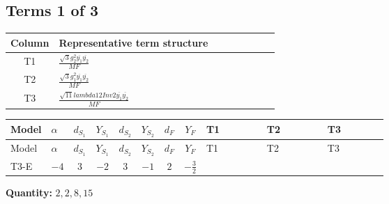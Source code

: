 \documentclass[8pt]{article}
\begin{document}
\begin{landscape}
\subsection*{Terms 1 of 3}
\begin{center}
\begin{tabular}{@{}c >{\raggedright\arraybackslash}p{0.82\linewidth}@{}}
\toprule
Column & Representative term structure \\
\midrule
T1 & \(\displaystyle \frac{\sqrt{3} g_{2}^{2} \overline{y_{1}} \overline{y_{2}}}{MF}\) \\
\midrule
T2 & \(\displaystyle \frac{\sqrt{3} g_{1}^{2} \overline{y_{1}} \overline{y_{2}}}{MF}\) \\
\midrule
T3 & \(\displaystyle \frac{\sqrt{11} lambda12Inv2 \overline{y_{1}} \overline{y_{2}}}{MF}\) \\
\midrule
\bottomrule
\end{tabular}
\end{center}
\smallskip
\tiny
\begin{longtable}{@{}llcccccc >{\raggedright\arraybackslash}p{0.21\linewidth} >{\raggedright\arraybackslash}p{0.21\linewidth} >{\raggedright\arraybackslash}p{0.21\linewidth}@{}}
\toprule
Model & $\alpha$ & $d_{S_1}$ & $Y_{S_1}$ & $d_{S_2}$ & $Y_{S_2}$ & $d_F$ & $Y_F$ & T1 & T2 & T3 \\
\midrule
\endfirsthead
\toprule
Model & $\alpha$ & $d_{S_1}$ & $Y_{S_1}$ & $d_{S_2}$ & $Y_{S_2}$ & $d_F$ & $Y_F$ & T1 & T2 & T3 \\
\midrule
\endhead
T3-E & $-4$ & $3$ & $-2$ & $3$ & $-1$ & $2$ & $-\frac{3}{2}$ & \scriptsize\adjustbox{max width=\linewidth}{$\begin{gathered} - \frac{49 \sqrt{3} g_{2}^{2} \overline{y_{1}} \overline{y_{2}}}{24 MF}\end{gathered}$} & \scriptsize\adjustbox{max width=\linewidth}{$\begin{gathered} - \frac{9 \sqrt{3} g_{1}^{2} \overline{y_{1}} \overline{y_{2}}}{8 MF}\end{gathered}$} & \scriptsize\adjustbox{max width=\linewidth}{$\begin{gathered} - \frac{3 \sqrt{11} lambda12Inv2 \overline{y_{1}} \overline{y_{2}}}{22 MF}\end{gathered}$} \\
\midrule
\bottomrule
\end{longtable}
\clearpage
\noindent\textbf{Quantity: }$\mathrm{2,2,8,15}$\par\smallskip

\end{landscape}
\end{document}
